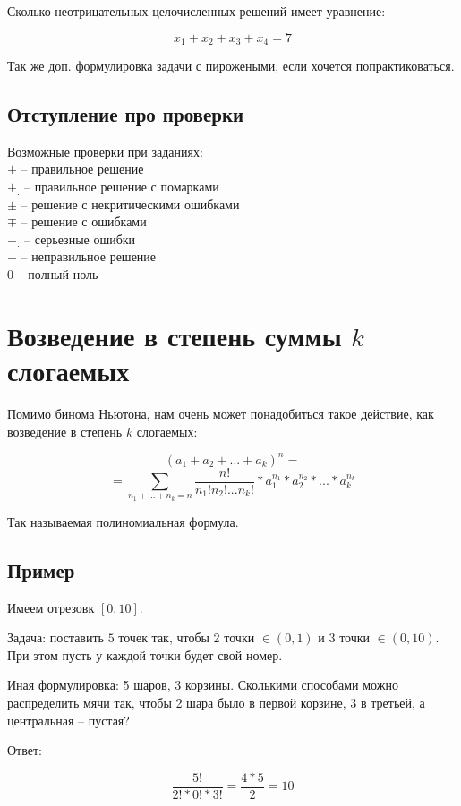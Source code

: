 \documentclass{article}
\begin{document}
Сколько неотрицательных целочисленных решений имеет уравнение:

$$x_1 + x_2 + x_3 + x_4 = 7$$

Так же доп. формулировка задачи с пирожеными, если хочется попрактиковаться.

\subsection{Отступление про проверки}

Возможные проверки при заданиях:\\
$+$ -- правильное решение\\
$+_{.}$ -- правильное решение с помарками\\
$\pm$ -- решение с некритическими ошибками\\
$\mp$ -- решение с ошибками\\
$-_{.}$ -- серьезные ошибки\\
$-$ -- неправильное решение\\
$0$ -- полный ноль\\

\section{Возведение в степень суммы $k$ слогаемых}

Помимо бинома Ньютона, нам очень может понадобиться такое действие, как возведение в степень $k$ слогаемых:

$$(a_1 + a_2 + ... + a_k) ^ n =$$
$$ = \sum_{n_1 + ... + n_k = n}{\frac{n!}{n_1!n_2!...n_k!} * a_1^{n_1}* a_2^{n_2} *... * a_k^{n_k}}$$

Так называемая полиномиальная формула.

\subsection{Пример}

Имеем отрезовк $[0, 10]$.

Задача: поставить $5$ точек так, чтобы 2 точки $\in (0, 1)$  и 3 точки $\in (0, 10)$.
При этом пусть у каждой точки будет свой номер.


Иная формулировка: 5 шаров, 3 корзины. Сколькими способами можно распределить мячи так, чтобы 2 шара было в первой корзине, 3 в третьей, а центральная -- пустая?

Ответ:

$$\frac{5!}{2! * 0! * 3!} = \frac{4 * 5}{2} = 10 $$
\end{document}
